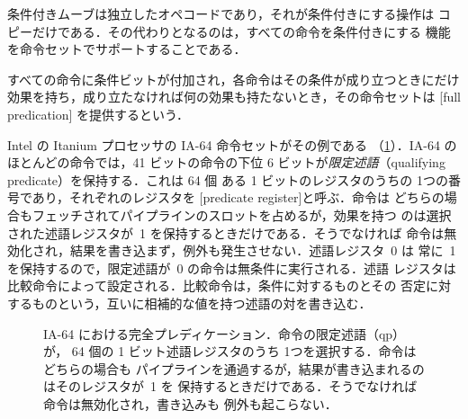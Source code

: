 \documentclass[../main.tex]{subfiles}
\begin{document}
条件付きムーブは独立したオペコードであり，それが条件付きにする操作は
コピーだけである．その代わりとなるのは，すべての命令を条件付きにする
機能を命令セットでサポートすることである．

\begin{definition}[完全プレディケーション]
  \label{def:l05-full-predication}
  すべての命令に条件ビットが付加され，各命令はその条件が成り立つときにだけ
  効果を持ち，成り立たなければ何の効果も持たないとき，その命令セットは
  [full predication]%
  を提供するという．
\end{definition}

Intel の Itanium プロセッサの IA-64 命令セットがその例である%
（\cref{fig:l05-qp}）．IA-64 のほとんどの命令では，41 ビットの命令の下位
6 ビットが\emph{限定述語}（qualifying predicate）を保持する．これは 64 個
ある 1 ビットのレジスタのうちの 1つの番号であり，それぞれのレジスタを
[predicate register]と呼ぶ．命令は
どちらの場合もフェッチされてパイプラインのスロットを占めるが，効果を持つ
のは選択された述語レジスタが~1 を保持するときだけである．そうでなければ
命令は無効化され，結果を書き込まず，例外も発生させない．述語レジスタ~0 は
常に~1 を保持するので，限定述語が~0 の命令は無条件に実行される．述語
レジスタは比較命令によって設定される．比較命令は，条件に対するものとその
否定に対するものという，互いに相補的な値を持つ述語の対を書き込む．%

\begin{figure}[htbp]
  \centering
  
  \caption{IA-64 における完全プレディケーション．命令の限定述語（qp）が，
    64 個の 1 ビット述語レジスタのうち 1つを選択する．命令はどちらの場合も
    パイプラインを通過するが，結果が書き込まれるのはそのレジスタが~1 を
    保持するときだけである．そうでなければ命令は無効化され，書き込みも
    例外も起こらない．}
  \label{fig:l05-qp}
\end{figure}
\end{document}
